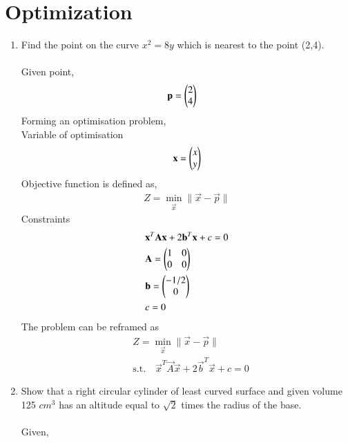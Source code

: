\documentclass[journal,12pt,twocolumn]{IEEEtran}
\renewcommand\thesection{\arabic{section}}
\begin{document}
\section{Optimization}
\renewcommand{\theequation}{\theenumi}
\begin{enumerate}[label=\thesection.\arabic*.,ref=\thesection.\theenumi]
\item Find the point on the curve $x^2=8y $ which is nearest to the point (2,4).\\
\solution\\
Given point, 
\begin{align}
&\mathbf{p} = \begin{pmatrix}2\\4\end{pmatrix}
\end{align}
Forming an optimisation problem,\\
Variable of optimisation
\begin{align}
\mathbf{x} = \begin{pmatrix}x\\y\end{pmatrix}
\end{align}
Objective function is defined as,
\begin{align}
Z = \min_{\vec{x}}\|\vec{x} - \vec{p}\|
\end{align}
Constraints
\begin{align}
&\mathbf{x}^T\mathbf{A}\mathbf{x}+2\mathbf{b}^T\mathbf{x}+c=0\\
&\mathbf{A} = \begin{pmatrix}1&0\\0&0\end{pmatrix}\\
&\mathbf{b}= \begin{pmatrix}-1/2\\0\end{pmatrix}\\
&c=0
\end{align}
The problem can be reframed as
\begin{align}
&Z = \min_{\vec{x}}\|\vec{x} - \vec{p}\| \nonumber\\
&\textrm{s.t.} \quad \vec{x}^T\vec{A}\vec{x}+2\vec{b}^T\vec{x}+c=0
\end{align}
\item Show that a right circular cylinder of least curved surface and given volume 125 $cm^3$ has an altitude equal to $ \sqrt{2} $ times the radius of the base.\\
\solution\\
Given,
\begin{table}[ht]
 \centering
\end{table}
\end{enumerate}
\end{document}
